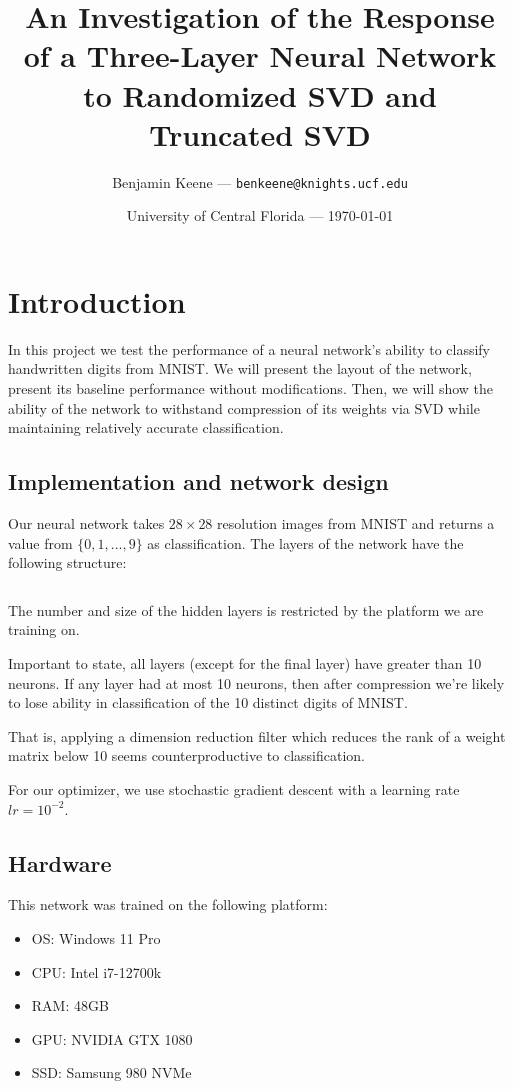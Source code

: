 \documentclass{article}
\title{An Investigation of the Response of a Three-Layer Neural Network to Randomized SVD and Truncated SVD} %
\author{Benjamin Keene --- \texttt{benkeene@knights.ucf.edu}} %
\date{University of Central Florida --- \today} %
\begin{document}
\maketitle %

{
	\hypersetup{linkcolor=black}
	\tableofcontents
}

\section{Introduction}
In this project we test the performance of a neural network's ability to classify handwritten digits from MNIST.
We will present the layout of the network, present its baseline performance without modifications.
Then, we will show the ability of the network to withstand compression of its weights via SVD while maintaining relatively accurate classification.

\subsection{Implementation and network design}
Our neural network takes $28 \times 28$ resolution images from MNIST and returns a value from $\{0,1,...,9\}$ as classification.
The layers of the network have the following structure:

\inputminted{python}{snippets/struct.py}

The number and size of the hidden layers is restricted by the platform we are training on.

\bigskip

Important to state, all layers (except for the final layer) have greater than 10 neurons.
If any layer had at most 10 neurons, then after compression we're likely to lose ability in classification of the 10 distinct digits of MNIST.

That is, applying a dimension reduction filter which reduces the rank of a weight matrix below 10 seems counterproductive to classification.

\bigskip

For our optimizer, we use stochastic gradient descent with a learning rate $lr = 10^{-2}$.

\subsection{Hardware}

This network was trained on the following platform:
\begin{itemize}
	\item OS: Windows 11 Pro
	\item CPU: Intel i7-12700k
	\item RAM: 48GB
	\item GPU: NVIDIA GTX 1080
	\item SSD: Samsung 980 NVMe
\end{itemize}
\end{document}
